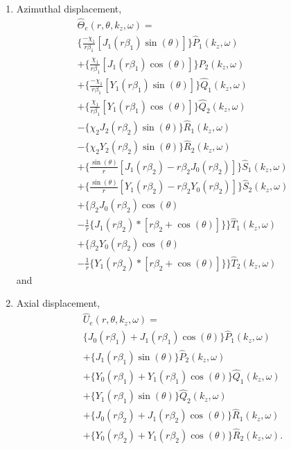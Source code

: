 \documentclass[twocolumn,10pt]{asme2ej}
\begin{document}
\begin{enumerate}[label=\roman*]
    \item Azimuthal displacement,
    \begin{multline}\label{Azimuthal displacement 3d}
    \hat{\Theta}_e(r,\theta,k_z,\omega) =\\ \Bigg\{\frac{-\chi_1}{r\beta_1}[J_1(r\beta_1)\sin(\theta)]\Bigg\}\hat{P}_1(k_z,\omega)\\ + \Bigg\{\frac{\chi_1}{r\beta_1}[J_1(r\beta_1)\cos(\theta)]\Bigg\}\hat{P}_2(k_z,\omega)\\ + \Bigg\{\frac{-\chi_1}{r\beta_1}[Y_1(r\beta_1)\sin(\theta)]\Bigg\}\hat{Q}_1(k_z,\omega)\\ + \Bigg\{\frac{\chi_1}{r\beta_1}[Y_1(r\beta_1)\cos(\theta)]\Bigg\}\hat{Q}_2(k_z,\omega)\\ - \Bigg\{\chi_2J_2(r\beta_2)\sin(\theta)\Bigg\}\hat{R}_1(k_z,\omega)\\ - \Bigg\{\chi_2Y_2(r\beta_2)\sin(\theta)\Bigg\}\hat{R}_2(k_z,\omega)\\ + \Bigg\{\frac{\sin(\theta)}{r}[J_1(r\beta_2)-r\beta_2J_0(r\beta_2)]\Bigg\}\hat{S}_1(k_z,\omega)\\ + \Bigg\{\frac{\sin(\theta)}{r}[Y_1(r\beta_2)-r\beta_2Y_0(r\beta_2)]\Bigg\}\hat{S}_2(k_z,\omega)\\ + \Bigg\{\beta_2J_0(r\beta_2)\cos(\theta)\\-\frac{1}{r}\{J_1(r\beta_2)*[r\beta_2+\cos(\theta)]\}\Bigg\}\hat{T}_1(k_z,\omega)\\ + \Bigg\{\beta_2Y_0(r\beta_2)\cos(\theta)\\-\frac{1}{r}\{Y_1(r\beta_2)*[r\beta_2+\cos(\theta)]\}\Bigg\}\hat{T}_2(k_z,\omega)
    \end{multline}
and
    \item Axial displacement,
    \begin{multline}\label{Axial displacement 3d}    
    \hat{U}_{e}(r,\theta,k_z,\omega) =\\ \bigg\{J_{0}(r\beta_1) + J_{1}(r\beta_1)\cos(\theta)\bigg\}\hat{P}_1(k_z,\omega)\\ + \bigg\{J_{1}(r\beta_1)\sin(\theta)\bigg\}\hat{P}_2(k_z,\omega)\\
    + \bigg\{Y_{0}(r\beta_1) + Y_{1}(r\beta_1)\cos(\theta)\bigg\}\hat{Q}_1(k_z,\omega)\\ + \bigg\{Y_{1}(r\beta_1)\sin(\theta)\bigg\}\hat{Q}_2(k_z,\omega)\\
    + \bigg\{J_{0}(r\beta_2) + J_{1}(r\beta_2)\cos(\theta)\bigg\}\hat{R}_1(k_z,\omega)\\ + \bigg\{Y_{0}(r\beta_2) + Y_{1}(r\beta_2)\cos(\theta)\bigg\}\hat{R}_2(k_z,\omega).
    \end{multline}    
\end{enumerate}
\end{document}
